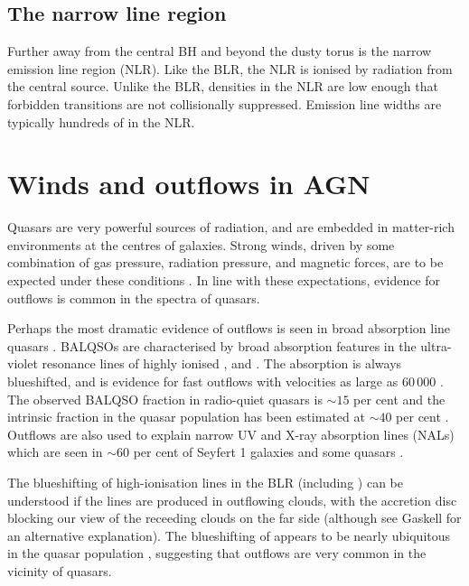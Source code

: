 \subsection{The narrow line region}

Further away from the central BH and beyond the dusty torus is the narrow emission line region (NLR). 
Like the BLR, the NLR is ionised by radiation from the central source. 
Unlike the BLR, densities in the NLR are low enough that forbidden transitions are not collisionally suppressed. 
Emission line widths are typically hundreds of \kms in the NLR. 

\section{Winds and outflows in AGN}

Quasars are very powerful sources of radiation, and are embedded in matter-rich environments at the centres of galaxies.
Strong winds, driven by some combination of gas pressure, radiation pressure, and magnetic forces, are to be expected under these conditions \citep[e.g.][]{blandford82b,proga00,everett05}. 
In line with these expectations, evidence for outflows is common in the spectra of quasars. 

Perhaps the most dramatic evidence of outflows is seen in broad absorption line quasars \citep[BALQSOs;][]{weymann91}.
BALQSOs are characterised by broad absorption features in the ultra-violet resonance lines of highly ionised ,  and . 
The absorption is always blueshifted, and is evidence for fast outflows with velocities as large as 60\,000 \kms \citep[e.g.][]{turnshek88}. 
The observed  BALQSO fraction in radio-quiet quasars is $\sim$$15$ per cent \citep[e.g.][]{hewett03,reichard03} and the intrinsic fraction in the quasar population has been estimated at $\sim$$40$ per cent \citep{allen11}.
Outflows are also used to explain narrow UV and X-ray absorption lines (NALs) which are seen in $\sim$$60$ per cent of Seyfert 1 galaxies \citep{crenshaw99} and some quasars \citep[e.g.][]{hamann97}. 

The blueshifting of high-ionisation lines in the BLR (including ) can be understood if the lines are produced in outflowing clouds, with the accretion disc blocking our view of the receeding clouds on the far side (although see Gaskell for an alternative explanation). 
The blueshifting of  appears to be nearly ubiquitous in the quasar population \citep[e.g.][]{richards02,richards11}, suggesting that outflows are very common in the vicinity of quasars. 

